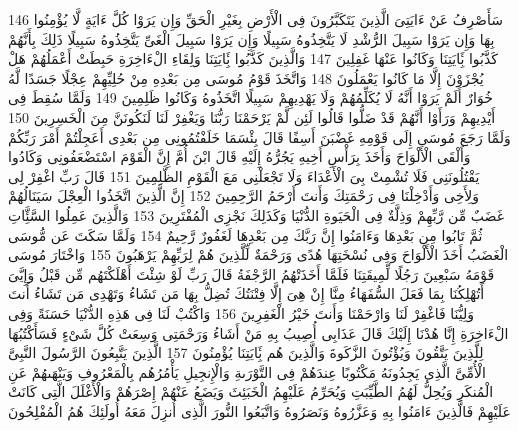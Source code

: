 \documentclass[20pt,a4paper]{article}
\begin{document}
{\tiny\colorbox{cl_aya}{146}} سَأَصْرِفُ عَنْ ءَايَتِىَ الَّذِينَ يَتَكَبَّرُونَ فِى الْأَرْضِ بِغَيْرِ الْحَقِّ وَإِن يَرَوْا كُلَّ ءَايَةٍ لَّا يُؤْمِنُوا بِهَا وَإِن يَرَوْا سَبِيلَ الرُّشْدِ لَا يَتَّخِذُوهُ سَبِيلًا وَإِن يَرَوْا سَبِيلَ الْغَىِّ يَتَّخِذُوهُ سَبِيلًا ذَلِكَ بِأَنَّهُمْ كَذَّبُوا بَِٔايَتِنَا وَكَانُوا عَنْهَا غَفِلِينَ
{\tiny\colorbox{cl_aya}{147}} وَالَّذِينَ كَذَّبُوا بَِٔايَتِنَا وَلِقَاءِ الْءَاخِرَةِ حَبِطَتْ أَعْمَلُهُمْ هَلْ يُجْزَوْنَ إِلَّا مَا كَانُوا يَعْمَلُونَ
{\tiny\colorbox{cl_aya}{148}} وَاتَّخَذَ قَوْمُ مُوسَى مِن بَعْدِهِ مِنْ حُلِيِّهِمْ عِجْلًا جَسَدًا لَّهُ خُوَارٌ أَلَمْ يَرَوْا أَنَّهُ لَا يُكَلِّمُهُمْ وَلَا يَهْدِيهِمْ سَبِيلًا اتَّخَذُوهُ وَكَانُوا ظَلِمِينَ
{\tiny\colorbox{cl_aya}{149}} وَلَمَّا سُقِطَ فِى أَيْدِيهِمْ وَرَأَوْا أَنَّهُمْ قَدْ ضَلُّوا قَالُوا لَئِن لَّمْ يَرْحَمْنَا رَبُّنَا وَيَغْفِرْ لَنَا لَنَكُونَنَّ مِنَ الْخَسِرِينَ
{\tiny\colorbox{cl_aya}{150}} وَلَمَّا رَجَعَ مُوسَى إِلَى قَوْمِهِ غَضْبَنَ أَسِفًا قَالَ بِئْسَمَا خَلَفْتُمُونِى مِن بَعْدِى أَعَجِلْتُمْ أَمْرَ رَبِّكُمْ وَأَلْقَى الْأَلْوَاحَ وَأَخَذَ بِرَأْسِ أَخِيهِ يَجُرُّهُ إِلَيْهِ قَالَ ابْنَ أُمَّ إِنَّ الْقَوْمَ اسْتَضْعَفُونِى وَكَادُوا يَقْتُلُونَنِى فَلَا تُشْمِتْ بِىَ الْأَعْدَاءَ وَلَا تَجْعَلْنِى مَعَ الْقَوْمِ الظَّلِمِينَ
{\tiny\colorbox{cl_aya}{151}} قَالَ رَبِّ اغْفِرْ لِى وَلِأَخِى وَأَدْخِلْنَا فِى رَحْمَتِكَ وَأَنتَ أَرْحَمُ الرَّحِمِينَ
{\tiny\colorbox{cl_aya}{152}} إِنَّ الَّذِينَ اتَّخَذُوا الْعِجْلَ سَيَنَالُهُمْ غَضَبٌ مِّن رَّبِّهِمْ وَذِلَّةٌ فِى الْحَيَوةِ الدُّنْيَا وَكَذَلِكَ نَجْزِى الْمُفْتَرِينَ
{\tiny\colorbox{cl_aya}{153}} وَالَّذِينَ عَمِلُوا السَّئَِّاتِ ثُمَّ تَابُوا مِن بَعْدِهَا وَءَامَنُوا إِنَّ رَبَّكَ مِن بَعْدِهَا لَغَفُورٌ رَّحِيمٌ
{\tiny\colorbox{cl_aya}{154}} وَلَمَّا سَكَتَ عَن مُّوسَى الْغَضَبُ أَخَذَ الْأَلْوَاحَ وَفِى نُسْخَتِهَا هُدًى وَرَحْمَةٌ لِّلَّذِينَ هُمْ لِرَبِّهِمْ يَرْهَبُونَ
{\tiny\colorbox{cl_aya}{155}} وَاخْتَارَ مُوسَى قَوْمَهُ سَبْعِينَ رَجُلًا لِّمِيقَتِنَا فَلَمَّا أَخَذَتْهُمُ الرَّجْفَةُ قَالَ رَبِّ لَوْ شِئْتَ أَهْلَكْتَهُم مِّن قَبْلُ وَإِيَّىَ أَتُهْلِكُنَا بِمَا فَعَلَ السُّفَهَاءُ مِنَّا إِنْ هِىَ إِلَّا فِتْنَتُكَ تُضِلُّ بِهَا مَن تَشَاءُ وَتَهْدِى مَن تَشَاءُ أَنتَ وَلِيُّنَا فَاغْفِرْ لَنَا وَارْحَمْنَا وَأَنتَ خَيْرُ الْغَفِرِينَ
{\tiny\colorbox{cl_aya}{156}} وَاكْتُبْ لَنَا فِى هَذِهِ الدُّنْيَا حَسَنَةً وَفِى الْءَاخِرَةِ إِنَّا هُدْنَا إِلَيْكَ قَالَ عَذَابِى أُصِيبُ بِهِ مَنْ أَشَاءُ وَرَحْمَتِى وَسِعَتْ كُلَّ شَىْءٍ فَسَأَكْتُبُهَا لِلَّذِينَ يَتَّقُونَ وَيُؤْتُونَ الزَّكَوةَ وَالَّذِينَ هُم بَِٔايَتِنَا يُؤْمِنُونَ
{\tiny\colorbox{cl_aya}{157}} الَّذِينَ يَتَّبِعُونَ الرَّسُولَ النَّبِىَّ الْأُمِّىَّ الَّذِى يَجِدُونَهُ مَكْتُوبًا عِندَهُمْ فِى التَّوْرَىةِ وَالْإِنجِيلِ يَأْمُرُهُم بِالْمَعْرُوفِ وَيَنْهَىهُمْ عَنِ الْمُنكَرِ وَيُحِلُّ لَهُمُ الطَّيِّبَتِ وَيُحَرِّمُ عَلَيْهِمُ الْخَبَئِثَ وَيَضَعُ عَنْهُمْ إِصْرَهُمْ وَالْأَغْلَلَ الَّتِى كَانَتْ عَلَيْهِمْ فَالَّذِينَ ءَامَنُوا بِهِ وَعَزَّرُوهُ وَنَصَرُوهُ وَاتَّبَعُوا النُّورَ الَّذِى أُنزِلَ مَعَهُ أُولَئِكَ هُمُ الْمُفْلِحُونَ
\end{document}
